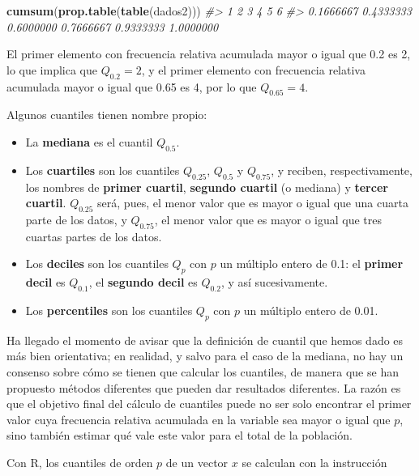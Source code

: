 \documentclass[
]{book}
\newenvironment{Shaded}{\begin{snugshade}}{\end{snugshade}}
\newcommand{\CommentTok}[1]{\textcolor[rgb]{0.56,0.35,0.01}{\textit{#1}}}
\newcommand{\KeywordTok}[1]{\textcolor[rgb]{0.13,0.29,0.53}{\textbf{#1}}}
\newcommand{\NormalTok}[1]{#1}
\theoremstyle{definition}
\theoremstyle{definition}
\theoremstyle{definition}
\theoremstyle{remark}
\begin{document}
\begin{Shaded}
\begin{Highlighting}[]
\KeywordTok{cumsum}\NormalTok{(}\KeywordTok{prop.table}\NormalTok{(}\KeywordTok{table}\NormalTok{(dados2)))}
\CommentTok{\#\textgreater{}         1         2         3         4         5         6 }
\CommentTok{\#\textgreater{} 0.1666667 0.4333333 0.6000000 0.7666667 0.9333333 1.0000000}
\end{Highlighting}
\end{Shaded}

El primer elemento con frecuencia relativa acumulada mayor o igual que 0.2 es 2, lo que implica que \(Q_{0.2}=2\), y el primer elemento con frecuencia relativa acumulada mayor o igual que 0.65 es 4, por lo que \(Q_{0.65}=4\).

Algunos cuantiles tienen nombre propio:

\begin{itemize}
\item
  La \textbf{mediana} es el cuantil \(Q_{0.5}\).
\item
  Los \textbf{cuartiles} son los cuantiles \(Q_{0.25}\), \(Q_{0.5}\) y \(Q_{0.75}\), y reciben, respectivamente, los nombres de \textbf{primer cuartil}, \textbf{segundo cuartil} (o mediana) y \textbf{tercer cuartil}. \(Q_{0.25}\) será, pues, el menor valor que es mayor o igual que una cuarta parte de los datos, y \(Q_{0.75}\), el menor valor que es mayor o igual que tres cuartas partes de los datos.
\item
  Los \textbf{deciles} son los cuantiles \(Q_{p}\) con \(p\) un múltiplo entero de 0.1: el \textbf{primer decil} es \(Q_{0.1}\), el \textbf{segundo decil} es \(Q_{0.2}\), y así sucesivamente.
\item
  Los \textbf{percentiles} son los cuantiles \(Q_{p}\) con \(p\) un múltiplo entero de 0.01.
\end{itemize}

Ha llegado el momento de avisar que la definición de cuantil que hemos dado es más bien orientativa; en realidad, y salvo para el caso de la mediana, no hay un consenso sobre cómo se tienen que calcular los cuantiles, de manera que se han propuesto métodos diferentes que pueden dar resultados diferentes. La razón es que el objetivo final del cálculo de cuantiles puede no ser solo encontrar el primer valor cuya frecuencia relativa acumulada en la variable sea mayor o igual que \(p\), sino también estimar qué vale este valor para el total de la población.

Con R, los cuantiles de orden \(p\) de un vector \(x\) se calculan con la instrucción
\end{document}
